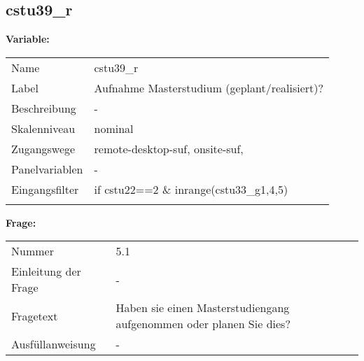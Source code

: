 	
	
	\subsection{cstu39\_r}
	\label{subSection:cstu39_r}

	\noindent\textbf{Variable:}\\
		\begin{tabular}{lL{11.3cm}}
			\label{tableVariable:cstu39_r}
			Name & cstu39\_r \\
			Label & Aufnahme Masterstudium (geplant/realisiert)? \\
			Beschreibung & - \\
			Skalenniveau & nominal \\
			Zugangswege &
				remote-desktop-suf,
				onsite-suf,
 \\
			Panelvariablen & -
			 \\
			Eingangsfilter & if cstu22==2 \& inrange(cstu33\_g1,4,5) \\
 \\
		\end{tabular}

		\vspace*{1 cm}
		\noindent\textbf{Frage:}\\
		\begin{tabular}{lL{11.3cm}}
			\label{tableQuestion:cstu39_r}
			Nummer & 5.1 \\
			Einleitung der Frage & - \\
			Fragetext & Haben sie einen Masterstudiengang aufgenommen oder planen Sie dies? \\
			Ausfüllanweisung & - \\
		\end{tabular}





